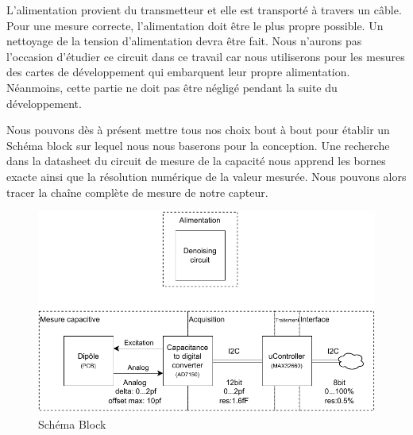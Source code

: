 L'alimentation provient du transmetteur et elle est transporté à travers un câble. Pour une mesure correcte, l'alimentation doit être le plus propre possible. Un nettoyage de la tension d'alimentation devra être fait. Nous n'aurons pas l’occasion d'étudier ce circuit dans ce travail car nous utiliserons pour les mesures des cartes de développement qui embarquent leur propre alimentation. Néanmoins, cette partie ne doit pas être négligé pendant la suite du développement.

\newpage
Nous pouvons dès à présent mettre tous nos choix bout à bout pour établir un Schéma block sur lequel nous nous baserons pour la conception. Une recherche dans la datasheet du circuit de mesure de la capacité nous apprend les bornes exacte ainsi que la résolution numérique de la valeur mesurée. Nous pouvons alors tracer la chaîne complète de mesure de notre capteur.

\begin{figure}[!ht]
 \centering
 \includegraphics[width=16cm]{SchemaBlock.pdf}
 \caption{Schéma Block}
\end{figure}

